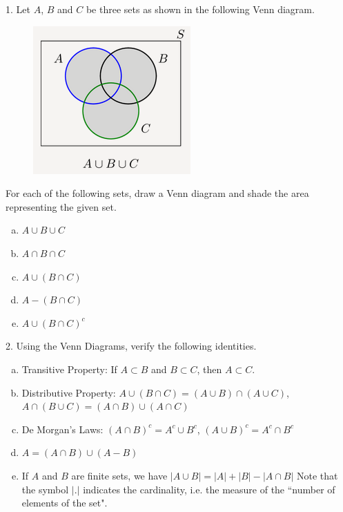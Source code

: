 \documentclass[12pt,thmsa]{article}
\begin{document}
1. Let $ A $, $ B $ and $ C $ be three sets as shown in the following Venn diagram.\\
\begin{figure}[h!]
\begin{center}
\includegraphics[scale=1]{Capture.png}
\end{center}
\end{figure}
\newline
For each of the following sets, draw a Venn diagram and shade the area representing the given set.
\begin{enumerate}[a)]
\item $ A \cup B \cup C $
\item $ A \cap B \cap C $
\item $ A \cup (B \cap C) $
\item $ A - (B \cap C) $
\item $ A \cup (B \cap C)^{c} $
\end{enumerate}
\vspace{1cm}
2. Using the Venn Diagrams, verify the following identities.
\begin{enumerate}[a)]
\item Transitive Property: If $A \subset B$ and $B \subset C$, then $A \subset C$. \\
\item Distributive Property: $A \cup (B \cap C) = (A \cup B) \cap (A \cup C)$, $A \cap (B \cup C) = (A \cap B) \cup (A \cap C) $ \\
\item De Morgan's Laws: $(A \cap B)^c = A^c \cup B^c $, $(A \cup B)^c = A^c \cap B^c $\\
\item $ A=(A \cap B) \cup (A-B) $
\item If $ A $ and $ B $ are finite sets, we have $ |A \cup B|=|A|+|B|-|A \cap B| $
\subitem Note that the symbol $ | . | $ indicates the cardinality, i.e. the measure of the ``number of elements of the set".
\end{enumerate}
\end{document}
